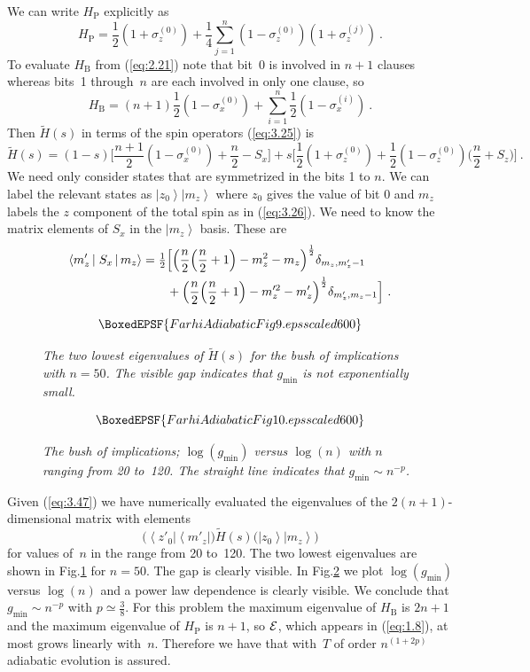 \documentclass[twoside]{article}
\newcommand{\half}{{\textstyle{\frac12}}}
\newcommand{\ket}[1]{\left|#1\right\rangle}
\newcommand{\bra}[1]{\left\langle#1\right|}
\newcommand{\numEq}[2]{\begin{equation}
   \label{eq:#1}
   #2\end{equation}}
\newcommand{\refEq}[1]{(\ref{eq:#1})}
\newcommand{\numFig}[3]{\begin{figure}[ht]
 $$\BoxedEPSF{#3}$$
    \caption{#2}\label{fig:#1}
   \end{figure}}
\newcommand{\refFig}[1]{Fig.\thinspace\ref{fig:#1}}
\newcommand{\rP}{{\mathrm{P}}}
\newcommand{\rB}{{\mathrm{B}}}
\newcommand{\gm}{g_{\min}}
\newcommand{\fract}[2]{{\textstyle\frac#1#2}}
\let\tilde\widetilde
\numberwithin{equation}{section}
\begin{document}
We can write $H_\rP$ explicitly as
\numEq{3.45}{ H_\rP=\half (1+\sigma_z^{(0)}) + {\textstyle \frac{1}{4}}
\sum^n_{j=1} (1-\sigma_z^{(0)})(1+\sigma_z^{(j)}) \ . } To evaluate $H_\rB$
from \refEq{2.21} note that bit~0 is involved in $n+1$ clauses whereas
bits~1 through~$n$ are each involved in only one clause, so
\numEq{4.47}{ H_\rB = (n+1)\half (1-\sigma_x^{(0)}) + \sum_{i=1}^n \half 
(1-\sigma_x^{(i)})\ . }
 Then $\tilde H(s)$ in terms of the spin operators
\refEq{3.25} is
\numEq{3.46}{
\tilde H(s)=(1-s) \Big[ \frac{n+1}2 (1-\sigma_x^{(0)}) + \frac{n}{2} -S_x
\Big]  + s \Big[ \half (1+\sigma_z^{(0)}) + \half (1-\sigma_z^{(0)})
\Big(\frac{n}{2} +S_z\Big)
\Big]\ . 
}
 We need only consider states that are symmetrized in the bits 1
to $n$.  We can label the relevant states as $\ket{z_0}\ket{m_z}$ where
$z_0$ gives the value of bit 0 and $m_z$ labels the $z$ component of the
total spin as in
\refEq{3.26}.  We need to know the matrix elements of $S_x$ in the
$\ket{m_z}$ basis.  These are
\begin{align}
\left\langle{m'_z}\mkern-2mu
\mid S_x \mkern-2mu \mid \mkern-2mu{m_z}
\right\rangle 
 &= \half \Big[\Big(\frac{n}{2} \Big(\frac{n}{2}+1\Big) - m^2_z - m_z
\Big)^{\frac12}\delta_{m_z, m'_z-1}\nonumber\\
&\qquad {} +
\Big(\frac{n}{2} \Big(\frac{n}{2}+1\Big) - m^{\prime 2}_z - m'_z
\Big)^{\frac12}\delta_{m'_z, m_z-1} \Big] \ .\label{eq:3.47} 
\end{align}

\numFig{9}{\slshape  The two lowest eigenvalues of $\tilde H(s)$ for the
bush of implications with $n=50$. The visible gap indicates that $\gm$ is not
exponentially small.}{FarhiAdiabaticFig9.eps scaled 600}

\numFig{10}{\slshape  The bush of implications; $\log(\gm)$ versus
$\log(n)$ with $n$ ranging from 20 to~120. The straight line indicates that
$\gm \sim n^{-p}$.}{FarhiAdiabaticFig10.eps scaled 600}

Given \refEq{3.47} we have numerically evaluated the eigenvalues of  the
$2(n+1)$-dimen\-sional matrix
 with elements
\numEq{4.50}{
\bigl(\bra{z'_0} \bra{m'_z}\bigr) \tilde H(s) \bigl(\ket{z_0} \ket{m_z}\bigr)
} for values of~$n$ in the range from 20 to~120. The two lowest
eigenvalues are shown in
\refFig9 for $n=50$. The gap is clearly visible. In \refFig{10} we plot
$\log(\gm)$ versus
$\log(n)$ and a power law dependence is clearly visible. We conclude that
$\gm\sim n^{-p}$ with $p\simeq \fract38$. For this problem the maximum
eigenvalue of $H_\rB$ is
$2n+1$ and the maximum eigenvalue of $H_\rP$ is $n+1$, so $\cal E$,
which appears in
\refEq{1.8}, at most grows linearly with~$n$. Therefore we have that
with~$T$ of order
$n^{(1+2p)}$ adiabatic evolution is assured. 
\end{document}
